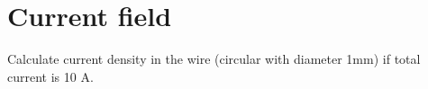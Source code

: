 \section{Current field}

\begin{Exercise}[difficulty=1]
Calculate current density in the wire (circular with diameter 1mm) if total current is 10 A.
\end{Exercise}
